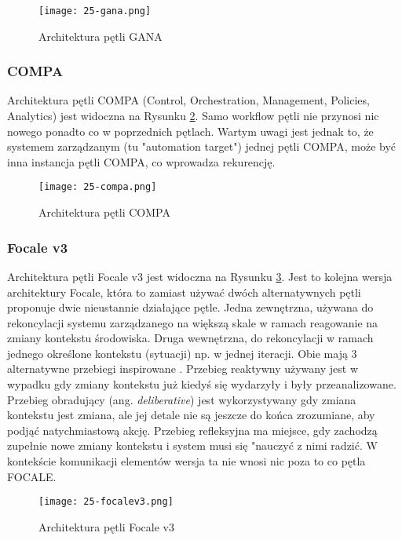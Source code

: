 \begin{figure}[!h]
    \centering \texttt{[image: 25-gana.png]}
    \caption{Architektura pętli GANA}\label{fig:25-gana}
\end{figure}

\subsubsection{COMPA}
Architektura pętli COMPA (Control, Orchestration, Management, Policies, Analytics) \cite{doyle2014} jest widoczna na Rysunku \ref{fig:25-compa}. Samo workflow pętli nie przynosi nic nowego ponadto co w poprzednich pętlach. Wartym uwagi jest jednak to, że systemem zarządzanym (tu "automation target") jednej pętli COMPA, może być inna instancja pętli COMPA, co wprowadza rekurencję. 

\begin{figure}[!h]
    \centering \texttt{[image: 25-compa.png]}
    \caption{Architektura pętli COMPA}\label{fig:25-compa}
\end{figure}

\subsubsection{Focale v3}
Architektura pętli Focale v3 \cite{strassner2009} jest widoczna na Rysunku \ref{fig:25-focalev3}. Jest to kolejna wersja architektury Focale, która to zamiast używać dwóch alternatywnych pętli proponuje dwie nieustannie działające pętle. Jedna zewnętrzna, używana do rekoncylacji systemu zarządzanego na większą skale w ramach reagowanie na zmiany kontekstu środowiska. Druga wewnętrzna, do rekoncylacji w ramach jednego określone kontekstu (sytuacji) np. w jednej iteracji. Obie mają 3 alternatywne przebiegi inspirowane \cite{minsky1986}. Przebieg reaktywny używany jest w wypadku gdy zmiany kontekstu już kiedyś się wydarzyły i były przeanalizowane. Przebieg obradujący (ang. \textit{deliberative}) jest wykorzystywany gdy zmiana kontekstu jest zmiana, ale jej detale nie są jeszcze do końca zrozumiane, aby podjąć natychmiastową akcję. Przebieg refleksyjna ma miejsce, gdy zachodzą zupełnie nowe zmiany kontekstu i system musi się "nauczyć z nimi radzić. W kontekście komunikacji elementów wersja ta nie wnosi nic poza to co pętla FOCALE.

\begin{figure}[!h]
    \centering \texttt{[image: 25-focalev3.png]}
    \caption{Architektura pętli Focale v3}\label{fig:25-focalev3}
\end{figure}
